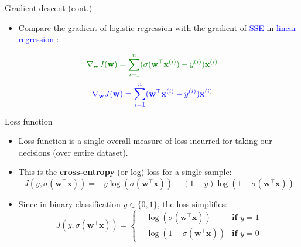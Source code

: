 \documentclass[serif, aspectratio=169]{beamer}
\begin{document}
\begin{frame}{Gradient descent (cont.)}
    \begin{itemize}
    
    \item Compare the gradient of \textcolor{deepgreen}{logistic regression} with the gradient of \textcolor{blue}{SSE} in \textcolor{blue}{linear regression} :
    \end{itemize}
        \begin{align*}
        \color{deepgreen}
             \nabla_{\mathbf{w}} J(\mathbf{w}) = \sum_{i=1}^{n} (\sigma (\mathbf{w}^\top \mathbf{x}^{(i)}) - y^{(i)})\mathbf{x}^{(i)} 
        \end{align*}
        \begin{align*}
            \color{blue}
            \nabla_{\mathbf{w}} J(\mathbf{w}) = \sum_{i=1}^{n} (\mathbf{w}^\top \mathbf{x}^{(i)} - y^{(i)})\mathbf{x}^{(i)}
        \end{align*}
        
\end{frame}
\begin{frame}{Loss function}
    \begin{itemize}
        \item Loss function is a single overall measure of loss incurred for taking our decisions (over entire dataset).
        \item This is the \textbf{cross-entropy} (or log) loss for a single sample:
        \[ J(y, \sigma (\mathbf{w}^\top  \mathbf{x})) = -y \log (\sigma ( \mathbf{w}^\top  \mathbf{x})) - (1-y) \log 
        (1 - \sigma (\mathbf{w}^\top  \mathbf{x}))
        \]
        
        \item Since in binary classification $y \in \{0, 1\}$, the loss simplifies:
            \[
                J(y, \sigma (\mathbf{w}^\top  \mathbf{x})) = \begin{cases}
                    - \log (\sigma (\mathbf{w}^\top  \mathbf{x})) & \textbf{if } y = 1 \\
                    - \log (1 - \sigma (\mathbf{w}^\top  \mathbf{x})) & \textbf{if } y = 0
                \end{cases}
            \]
    \end{itemize}
\end{frame}
\end{document}
